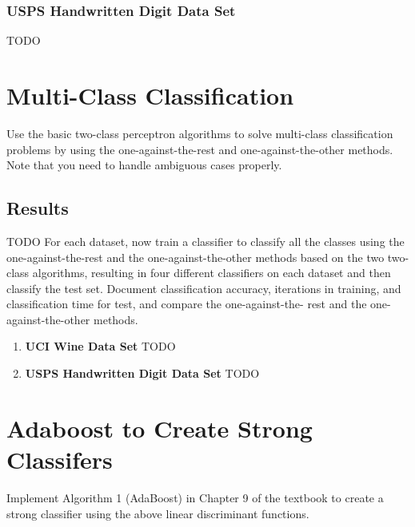 \documentclass{article}
\newcommand{\result}[1]{\subsubsection*{#1}}
\begin{document}
\result{USPS Handwritten Digit Data Set}
{\large TODO}


\section{Multi-Class Classification}
Use the basic two-class perceptron algorithms to solve multi-class classification problems by using the one-against-the-rest and one-against-the-other methods. Note that you need to handle ambiguous cases properly.

\subsection{Results}
{\large TODO}
For each dataset, now train a classifier to classify all the classes using the one-against-the-rest and the one-against-the-other methods based on the two two-class algorithms, resulting in four different classifiers on each dataset and then classify the test set. Document classification accuracy, iterations in training, and classification time for test, and compare the one-against-the- rest and the one-against-the-other methods.

\begin{enumerate}
\item {\bf UCI Wine Data Set}
{\large TODO}
\item {\bf USPS Handwritten Digit Data Set}
{\large TODO}
\end{enumerate}


\section{Adaboost to Create Strong Classifers}
Implement Algorithm 1 (AdaBoost) in Chapter 9 of the textbook to create a strong classifier using the above linear discriminant functions.
\end{document}
